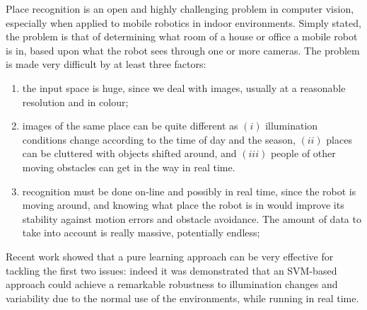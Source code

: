 
Place recognition is an open and highly challenging problem in
computer vision, especially when applied to mobile robotics in indoor
environments. Simply stated, the problem is that of determining what
room of a house or office a mobile robot is in, based upon what the
robot sees through one or more cameras. The problem is made very
difficult by at least three factors:

\begin{enumerate}

  \item the input space is huge, since we deal with images, usually at
    a reasonable resolution and in colour;

    \item images of the same place can be quite different as $(i)$
    illumination conditions change according to the time of day and
    the season, $(ii)$ places can be cluttered with objects shifted
    around, and $(iii)$ people of other moving obstacles can get in
    the way in real time.


  \item recognition must be done on-line and possibly in real time,
    since the robot is moving around, and knowing what place the robot
    is in would improve its stability against motion errors and
    obstacle avoidance. The amount of data to take into account is
    really massive, potentially endless;

\end{enumerate}

Recent work \cite{pronobis:iros06} showed that a pure learning approach can be very effective
for tackling the first two issues: indeed it was demonstrated that an SVM-based approach could achieve a remarkable robustness
to illumination changes and variability due to the normal use of the environments, while running 
in real time.

